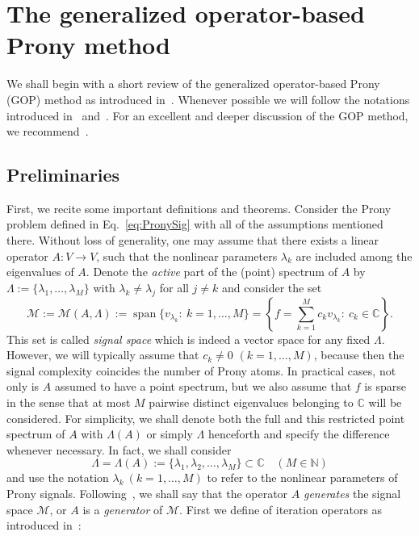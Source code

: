 \documentclass{arxiv}
\newcommand{\cM}{\mathcal{M}}
\begin{document}
\section{The generalized operator-based Prony method}
\label{sec:genPro}
We shall begin with a short review of the generalized operator-based Prony (GOP) method as introduced in~\cite{stampfer2020generalized}. Whenever possible we will follow the notations introduced in~\cite{peter2013generalized} and~\cite{stampfer2020generalized}. For an excellent and deeper discussion of the GOP method, we recommend~\cite{stampfer2019generalized}.

\subsection{Preliminaries}
\label{sec:prelims}
 First, we recite some important definitions and theorems. Consider the Prony problem defined in Eq.~\eqref{eq:PronySig} with all of the assumptions mentioned there. Without loss of generality, one may assume that there exists a linear operator $A : V \to V$, such that the nonlinear parameters $\lambda_k$ are included among the eigenvalues of $A$. Denote the \emph{active} part of the (point) spectrum of $A$ by $\Lambda := \{\lambda_1,\ldots,\lambda_M\}$ with $\lambda_k \neq \lambda_j$ for all $j \neq k$ and consider the set
\begin{equation}
     \label{eq:ma}
     \cM := \mathcal{M}(A,\Lambda) := \operatorname{span} \{v_{\lambda_k}:\ k=1,\ldots,M \} = \left\{ f = \sum_{k=1}^M c_k v_{\lambda_k}: \ c_k \in \mathbb{C}\right\}.
\end{equation}
This set is called \emph{signal space} which is indeed a vector space for any fixed $\Lambda$. However, we will typically assume that $c_k \neq 0$ $(k = 1,\ldots,M)$, because then the signal complexity coincides the number of Prony atoms.
In practical cases, not only is $A$ assumed to have a point spectrum, but we also assume that $f$ is sparse in the sense that at most $M$ pairwise distinct eigenvalues belonging to $\mathbb{C}$ will be considered.  For simplicity, we shall denote both the full and this restricted point spectrum of $A$ with $\Lambda(A)$ or simply $\Lambda$ henceforth and specify the difference whenever necessary. In fact, we shall consider
\begin{equation}
    \label{eq:lambset}
    \Lambda = \Lambda(A) := \{ \lambda_1, \lambda_2, \ldots, \lambda_M \} \subset \mathbb{C} \quad (M \in \mathbb{N})
\end{equation}
and use the notation $\lambda_k \ (k=1,\ldots,M)$ to refer to the nonlinear parameters of Prony signals. Following~\cite{stampfer2019generalized}, we shall say that the operator $A$ \textit{generates} the signal space $\cM$, or $A$ is a \emph{generator} of $\cM$. First we define of iteration operators as introduced in~\cite{stampfer2019generalized, stampfer2020generalized}:
\end{document}
